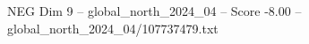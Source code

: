 \begin{textsample}{NEG Dim 9 – global\_north\_2024\_04 – Score -8.00 – global\_north\_2024\_04/107737479.txt}
\end{textsample}
